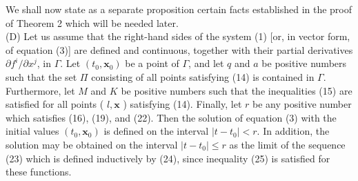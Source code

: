 \documentclass[10pt,a5paper]{book}
\theoremstyle{plain}
\theoremstyle{definition}
\theoremstyle{remark}
\begin{document}
We shall now state as a separate proposition certain facts established in the proof of Theorem 2 which will be needed later.\\[0pt]
(D) Let us assume that the right-hand sides of the system (1) [or, in vector form, of equation (3)] are defined and continuous, together with their partial derivatives $\partial f^{i} / \partial x^{j}$, in $\Gamma$. Let $\left(t_{0}, \mathbf{x}_{0}\right)$ be a point of $\Gamma$, and let $q$ and $a$ be positive numbers such that the set $\Pi$ consisting of all points satisfying (14) is contained in $\Gamma$. Furthermore, let $M$ and $K$ be positive numbers such that the inequalities (15) are satisfied for all points ( $l, \mathbf{x}$ ) satisfying (14). Finally, let $r$ be any positive number which satisfies (16), (19), and (22). Then the solution of equation (3) with the initial values $\left(t_{0}, \mathbf{x}_{0}\right)$ is defined on the interval $\left|t-t_{0}\right|<r$. In addition, the solution may be obtained on the interval $\left|t-t_{0}\right| \leq r$ as the limit of the sequence (23) which is defined inductively by (24), since inequality (25) is satisfied for these functions.
\end{document}
